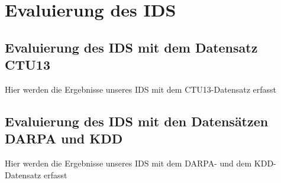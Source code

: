 \documentclass[main.tex]{subfiles}
\begin{document}
\section{Evaluierung des IDS}
\subsection{Evaluierung des IDS mit dem Datensatz CTU13}
Hier werden die Ergebnisse unseres IDS mit dem CTU13-Datensatz erfasst
\subsection{Evaluierung des IDS mit den Datensätzen DARPA und KDD}
Hier werden die Ergebnisse unseres IDS mit dem DARPA- und dem KDD-Datensatz erfasst
\end{document}
